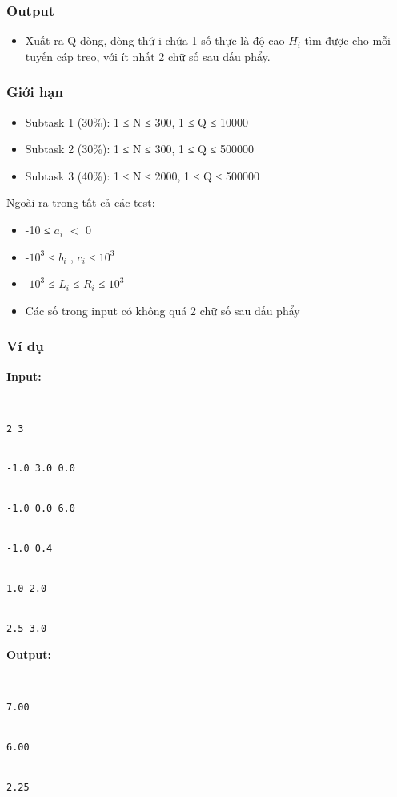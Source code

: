 \subsubsection{   Output  }
\begin{itemize}
	\item     Xuất ra Q dòng, dòng thứ i chứa 1 số thực là độ cao    \textbf{     $H_{i}$}    tìm được cho mỗi tuyến cáp treo, với ít nhất 2 chữ số sau dấu phẩy.   
\end{itemize}

\subsubsection{   Giới hạn  }
\begin{itemize}
	\item     Subtask 1 (30\%): 1 ≤ N ≤ 300, 1 ≤ Q ≤ 10000   
	\item     Subtask 2 (30\%): 1 ≤ N ≤ 300, 1 ≤ Q ≤ 500000   
	\item     Subtask 3 (40\%): 1 ≤ N ≤ 2000, 1 ≤ Q ≤ 500000   
\end{itemize}

   Ngoài ra trong tất cả các test:  
\begin{itemize}
	\item     -10 ≤ $a_{i}$    $<$ 0   
	\item     -$10^{3}$    ≤ $b_{i}$    , $c_{i}$    ≤ $10^{3}$
	\item     -$10^{3}$    ≤ $L_{i}$    ≤ $R_{i}$    ≤ $10^{3}$
	\item     Các số trong input có không quá 2 chữ số sau dấu phẩy   
\end{itemize}

\subsubsection{   Ví dụ  }

\textbf{    Input:   }
\begin{verbatim}


2 3


-1.0 3.0 0.0


-1.0 0.0 6.0


-1.0 0.4


1.0 2.0


2.5 3.0\end{verbatim}

\textbf{    Output:   }
\begin{verbatim}


7.00


6.00


2.25\end{verbatim}

